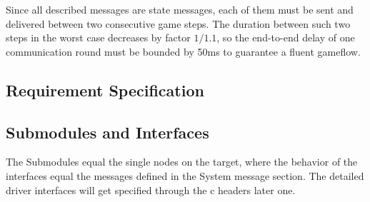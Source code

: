 Since all described messages are state messages, each of them must be sent and
delivered between two consecutive game steps. The duration between such two 
steps in the worst case decreases by factor $1/1.1$, so the end-to-end delay
of one communication round must be bounded by 50ms to guarantee a fluent gameflow. 
\subsection{Requirement Specification}

\subsection{Submodules and Interfaces}
The Submodules equal the single nodes on the target, where the behavior of the interfaces equal 
the messages defined in the System message section. The detailed driver interfaces will
get specified through the c headers later one.
